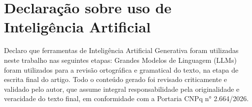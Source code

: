\documentclass[10pt,conference]{IEEEtran}
\begin{document}
\section*{Declaração sobre uso de Inteligência Artificial}
Declaro que ferramentas de Inteligência Artificial Generativa foram utilizadas neste trabalho nas seguintes etapas: Grandes Modelos de Linguagem (LLMs) foram utilizados para a revisão ortográfica e gramatical do texto, na etapa de escrita final do artigo. Todo o conteúdo gerado foi revisado criticamente e validado pelo autor, que assume integral responsabilidade pela originalidade e veracidade do texto final, em conformidade com a Portaria CNPq n° 2.664/2026.



\end{document}
